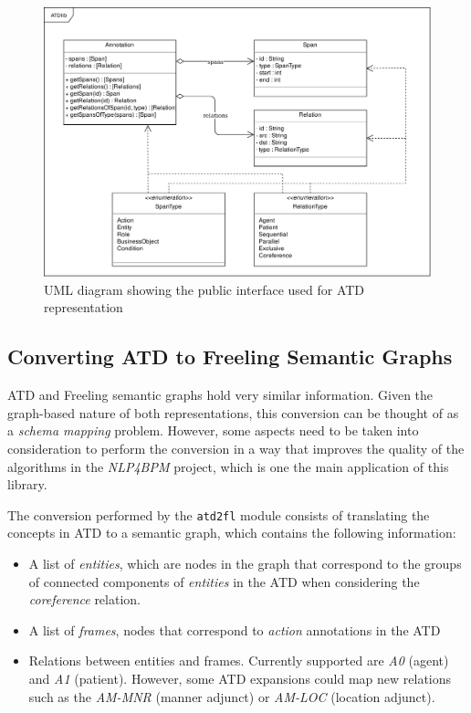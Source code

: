 \begin{figure}[htb]
  \centering
  \includegraphics[width=\textwidth]{figures/atdlib_uml}
  \caption{UML diagram showing the public interface used for ATD representation}
  \label{fig:atdlib_uml}
\end{figure}

\subsection{Converting ATD to Freeling Semantic Graphs}
\label{sec:atd2fl}

ATD and Freeling semantic graphs hold very similar information. Given the
graph-based nature of both representations, this conversion can be thought of as
a \emph{schema mapping} problem. However, some aspects need to be taken into
consideration to perform the conversion in a way that improves the quality of
the algorithms in the \emph{NLP4BPM} project, which is one the main application of
this library.

The conversion performed by the \texttt{atd2fl} module consists of
translating the concepts in ATD to a semantic graph, which contains the
following information:

\begin{itemize}
\item A list of \emph{entities}, which are nodes in the graph that correspond
  to the groups of connected components of \emph{entities} in the ATD when
  considering the \emph{coreference} relation. 
\item A list of \emph{frames}, nodes that correspond to \emph{action}
  annotations in the ATD
\item Relations between entities and frames. Currently supported are
  \emph{A0} (agent) and \emph{A1} (patient). However, some ATD expansions
  could map new relations such as the \emph{AM-MNR} (manner adjunct) or
  \emph{AM-LOC} (location adjunct).
\end{itemize}

